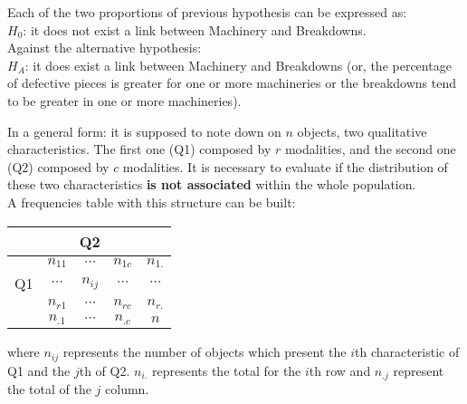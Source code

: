 \begin{frame}
  \vspace*{.25cm}
  Each of the two proportions of previous hypothesis can be expressed as:\\
  $ H_0 $: it does not exist a link between Machinery and Breakdowns.\\
  \vspace*{1cm}
  Against the alternative hypothesis:\\
  $ H_A $: it does exist a link between Machinery and Breakdowns (or, the percentage of defective pieces is greater for one or more machineries or the breakdowns tend to be greater in one or more machineries).
\end{frame}

\begin{frame}
  \vspace{-0.35cm}
  In a general form:  it is supposed to note down on $ n $ objects, two qualitative characteristics. The first one (Q1) composed by $ r $ modalities, and the second one (Q2) composed by $ c $ modalities. It is necessary to evaluate if the distribution of these two characteristics \textbf{is not associated} within the whole population.\\
  A frequencies table with this structure can be built:\\
  \begin{table}
    \begin{tabular}{|c|c|c|c|c|}
      \hline
      \multicolumn{1}{|c|}{} & \multicolumn{3}{|c|}{Q2} & \multicolumn{1}{|c|}{}\\ \hline
      & $n_{11}$ & $\cdots$ & $n_{1c}$ & $n_{1.}$ \\ \cline{2-5}
      Q1  & $\cdots$ & $n_{ij}$ & $\cdots$ & $\cdots$ \\ \cline{2-5} 
      & $n_{r1}$ & $\cdots$ & $n_{rc}$ & $n_{r.}$ \\ \hline
      & $n_{.1}$ & $\cdots$ & $n_{.c}$ & $n$ \\ \hline
    \end{tabular}
  \end{table} 
  where $ n_{ij} $ represents the number of objects which present the $ i $th characteristic of Q1 and the $ j $th of Q2. $ n_{i.} $ represents the total for the $ i $th row and $ n_{.j} $ represent the total of the $ j $ column.
\end{frame}

